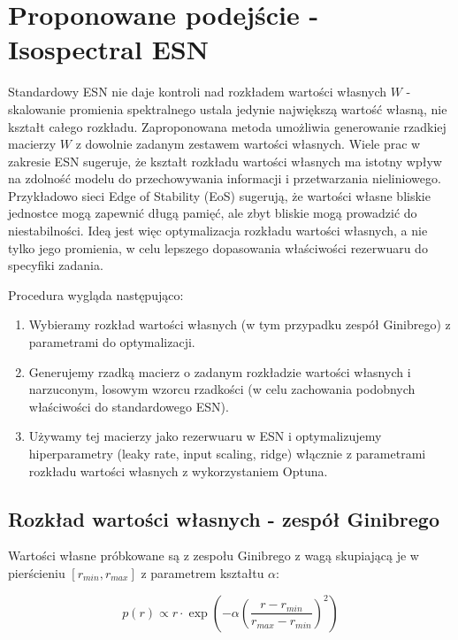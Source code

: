 \documentclass[12pt, a4paper]{article}
\begin{document}
\section{Proponowane podejście - Isospectral ESN}

Standardowy ESN nie daje kontroli nad rozkładem wartości własnych $W$ - skalowanie promienia spektralnego ustala jedynie największą wartość własną, nie kształt całego rozkładu. Zaproponowana metoda umożliwia generowanie rzadkiej macierzy $W$ z dowolnie zadanym zestawem wartości własnych. Wiele prac w zakresie ESN sugeruje, że kształt rozkładu wartości własnych ma istotny wpływ na zdolność modelu do przechowywania informacji i przetwarzania nieliniowego. Przykładowo sieci Edge of Stability (EoS) sugerują, że wartości własne bliskie jednostce mogą zapewnić długą pamięć, ale zbyt bliskie mogą prowadzić do niestabilności. Ideą jest więc optymalizacja rozkładu wartości własnych, a nie tylko jego promienia, w celu lepszego dopasowania właściwości rezerwuaru do specyfiki zadania.

Procedura wygląda następująco:
\begin{enumerate}
    \item Wybieramy rozkład wartości własnych (w tym przypadku zespół Ginibrego) z parametrami do optymalizacji.
    \item Generujemy rzadką macierz o zadanym rozkładzie wartości własnych i narzuconym, losowym wzorcu rzadkości (w celu zachowania podobnych właściwości do standardowego ESN).
    \item Używamy tej macierzy jako rezerwuaru w ESN i optymalizujemy hiperparametry (leaky rate, input scaling, ridge) włącznie z parametrami rozkładu wartości własnych z wykorzystaniem Optuna.
\end{enumerate}

\subsection{Rozkład wartości własnych - zespół Ginibrego}

Wartości własne próbkowane są z zespołu Ginibrego z wagą skupiającą je w pierścieniu $[r_{min}, r_{max}]$ z parametrem kształtu $\alpha$:

\begin{equation}
    p(r) \propto r \cdot \exp\!\left(-\alpha \left(\frac{r - r_{min}}{r_{max} - r_{min}}\right)^{\!2}\right)
\end{equation}
\end{document}
